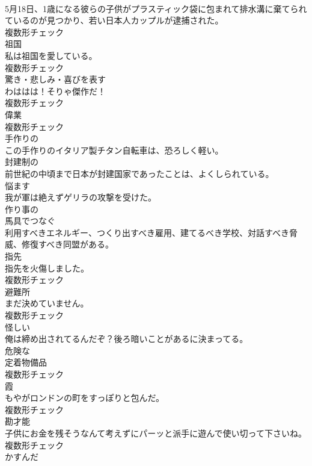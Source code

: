 \documentclass[8pt]{extreport}
\begin{document}
\begin{CJK}{UTF8}{min}
\\	5月18日、1歳になる彼らの子供がプラスティック袋に包まれて排水溝に棄てられているのが見つかり、若い日本人カップルが逮捕された。	
\\	複数形チェック
\\	[名詞]	祖国	
\\	私は祖国を愛している。	
\\	複数形チェック
\\	[名詞]	驚き・悲しみ・喜びを表す	
\\	わははは！そりゃ傑作だ！	
\\	複数形チェック
\\	[名詞]	偉業	
\\	複数形チェック
\\	[形容詞]	手作りの	
\\	この手作りのイタリア製チタン自転車は、恐ろしく軽い。	
\\	[形容詞]	封建制の	
\\	前世紀の中頃まで日本が封建国家であったことは、よくしられている。	
\\	[動詞]	悩ます	
\\	我が軍は絶えずゲリラの攻撃を受けた。	
\\	[形容詞]	作り事の	
\\	[動詞]	馬具でつなぐ	
\\	利用すべきエネルギー、つくり出すべき雇用、建てるべき学校、対話すべき脅威、修復すべき同盟がある。	
\\	[名詞]	指先	
\\	指先を火傷しました。	
\\	複数形チェック
\\	[名詞]	避難所	
\\	まだ決めていません。	
\\	複数形チェック
\\	[形容詞]	怪しい	
\\	俺は締め出されてるんだぞ？後ろ暗いことがあるに決まってる。	
\\	[形容詞]	危険な	
\\	[名詞]	定着物備品	
\\	複数形チェック
\\	[名詞]	霞	
\\	もやがロンドンの町をすっぽりと包んだ。	
\\	複数形チェック
\\	[名詞]	勘才能	
\\	子供にお金を残そうなんて考えずにパーッと派手に遊んで使い切って下さいね。	
\\	複数形チェック
\\	[形容詞]	かすんだ	

\end{CJK}
\end{document}
